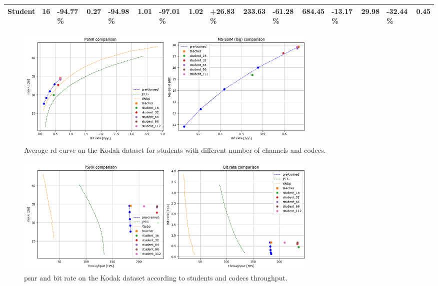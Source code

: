 \begin{table}
\begin{tabular}{|c|c|lr|lr|lr|lr|lr|lr|lr|}
        \multirow{-5}{*}{Student} & 16                         & {\color[HTML]{656565} -94.77 \%}                         & 0.27                         & {\color[HTML]{656565} -94.98 \%}                         & 1.01                         & {\color[HTML]{656565} -97.01 \%}                         & 1.02                         & {\color[HTML]{656565} +26.83 \%}                         & 233.63                         & {\color[HTML]{656565} -61.28 \%}                         & 684.45                          & {\color[HTML]{656565} -13.17 \%}                        & 29.98                         & {\color[HTML]{656565} -32.44 \%}                        & 0.45                         \\ \hline
    \end{tabular}
\end{table}

\begin{figure}
    \centering
    \includegraphics[width=15cm]{../img/codecs_rd.png}
    \caption[Average \acrshort{rd} curve on the Kodak dataset for students with different number of channels and codecs.]{Average \acrshort{rd} curve on the Kodak dataset for students with different number of channels and codecs.}
    \label{appendix:codecs_rd}
\end{figure}

\begin{figure}
    \centering
    \includegraphics[width=15cm]{../img/codecs_fps.png}
    \caption[\acrshort{psnr} and bit rate on the Kodak dataset according to students and codecs throughput.]{\acrshort{psnr} and bit rate on the Kodak dataset according to students and codecs throughput.}
    \label{appendix:codecs_fps}
\end{figure}

